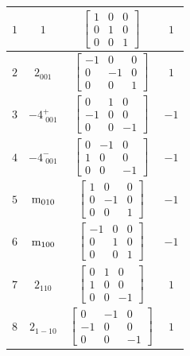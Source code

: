 \documentclass[fleqn,8pt]{jsarticle}
\begin{document}
\begin{longtable}{cccc}
$ 1 $ & $ 1 $ & $ \begin{bmatrix} 1 & 0 & 0 \\ 0 & 1 & 0 \\ 0 & 0 & 1 \end{bmatrix} $ & $ 1 $ \\ \hline
$ 2 $ & $ 2{}_{001} $ & $ \begin{bmatrix} -1 & 0 & 0 \\ 0 & -1 & 0 \\ 0 & 0 & 1 \end{bmatrix} $ & $ 1 $ \\ \hline
$ 3 $ & $ -4^{+}_{\,\,001} $ & $ \begin{bmatrix} 0 & 1 & 0 \\ -1 & 0 & 0 \\ 0 & 0 & -1 \end{bmatrix} $ & $ -1 $ \\ \hline
$ 4 $ & $ -4^{-}_{\,\,001} $ & $ \begin{bmatrix} 0 & -1 & 0 \\ 1 & 0 & 0 \\ 0 & 0 & -1 \end{bmatrix} $ & $ -1 $ \\ \hline
$ 5 $ & $ {\rm m}_{010} $ & $ \begin{bmatrix} 1 & 0 & 0 \\ 0 & -1 & 0 \\ 0 & 0 & 1 \end{bmatrix} $ & $ -1 $ \\ \hline
$ 6 $ & $ {\rm m}_{100} $ & $ \begin{bmatrix} -1 & 0 & 0 \\ 0 & 1 & 0 \\ 0 & 0 & 1 \end{bmatrix} $ & $ -1 $ \\ \hline
$ 7 $ & $ 2{}_{110} $ & $ \begin{bmatrix} 0 & 1 & 0 \\ 1 & 0 & 0 \\ 0 & 0 & -1 \end{bmatrix} $ & $ 1 $ \\ \hline
$ 8 $ & $ 2{}_{1-10} $ & $ \begin{bmatrix} 0 & -1 & 0 \\ -1 & 0 & 0 \\ 0 & 0 & -1 \end{bmatrix} $ & $ 1 $ \\
\end{longtable}
\end{document}
